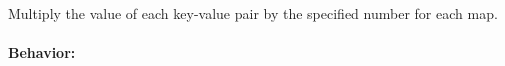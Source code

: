 Multiply the value of each key-value pair by the specified number for each map.

\paragraph{Behavior:}
\begin{itemize}[noitemsep]


\end{itemize}
